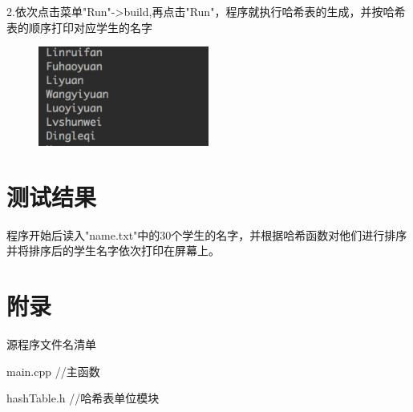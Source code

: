 \documentclass[paper=a4,UTF8,fontsize=11pt]{scrartcl} %
\numberwithin{equation}{section} %
\numberwithin{figure}{section} %
\numberwithin{table}{section} %
\begin{document}
2.依次点击菜单"Run"->build,再点击"Run"，程序就执行哈希表的生成，并按哈希表的顺序打印对应学生的名字
\begin{figure}[h]
    \centering
    \includegraphics[width=0.5\textwidth]{result1.png}
\end{figure}

\section{测试结果}
程序开始后读入"name.txt"中的30个学生的名字，并根据哈希函数对他们进行排序并将排序后的学生名字依次打印在屏幕上。

\section{附录}

源程序文件名清单

main.cpp               \qquad \quad  //主函数

hashTable.h            \qquad //哈希表单位模块
\end{document}
